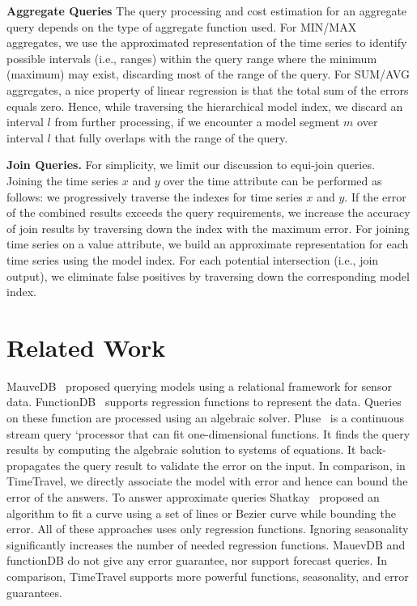 \documentclass[10pt,conference,letterpaper]{IEEEtran}
\begin{document}
{\bf Aggregate Queries}
The query processing and cost estimation for an aggregate query depends on the type of aggregate function used.
For MIN/MAX aggregates, we use the approximated representation of the time series to  identify  possible intervals (i.e., ranges) within the query range where the  minimum (maximum) may exist, 
discarding most of the range of the query.
For SUM/AVG aggregates,  a nice property of linear regression is that the total sum of the errors equals zero. Hence, while traversing the hierarchical model index, we discard an interval $l$ from further processing, if we encounter a model segment $m$ over interval $l$ that fully overlaps with the range of the query.

{\bf Join Queries.}
For simplicity, we limit our discussion to equi-join queries. 
Joining the time series $x$ and $y$ over the time attribute can be performed as follows: we progressively traverse the indexes for time series $x$ and  $y$. If the error of the combined results exceeds the query requirements, we increase the accuracy of join results by traversing down the index  with the maximum error.
 For joining time series on a value attribute, we build an approximate representation for each time series using the model index.  
For each potential intersection (i.e., join output), we eliminate false positives by traversing down the corresponding model index.

\section{Related Work}
\label{sec:related}

MauveDB~\cite{MauveDB} proposed  querying models using a relational framework for sensor data.  FunctionDB~\cite{functionDB} supports regression functions to represent the data. Queries on these function are processed using an algebraic solver.
Pluse~\cite{pluse} is a continuous stream query `processor that can fit one-dimensional functions. It finds the query results by computing the algebraic solution to systems of equations. It back-propagates the query result to validate the error on the input. In comparison, in TimeTravel, we directly associate the model with error and hence can bound the error of the answers. 
 To answer approximate queries Shatkay~\cite{Shatkay} proposed  an algorithm to fit a curve using a set of lines or Bezier curve while bounding the error.
All of these approaches uses only regression functions. Ignoring  seasonality significantly increases the number of needed regression functions. MauevDB and functionDB do not give any error guarantee, nor support forecast queries. In comparison, TimeTravel supports more powerful functions, seasonality, and error guarantees. 
\end{document}
